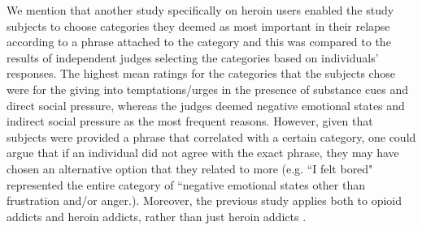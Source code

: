 \documentclass[12pt]{article}
\begin{document}
We mention that another study specifically on heroin users enabled the study subjects to choose categories they deemed as most important in their relapse according to a phrase attached to the category and this was compared to the results of independent judges selecting the categories based on individuals' responses. The highest mean ratings for the categories that the subjects chose were for the giving into temptations/urges in the presence of substance cues and direct social pressure, whereas the judges deemed negative emotional states and indirect social pressure as the most frequent reasons. However, given that subjects were provided a phrase that correlated with a certain category, one could argue that if an individual did not agree with the exact phrase, they may have chosen an alternative option that they related to more (e.g. ``I felt bored" represented the entire category of ``negative emotional states other than frustration and/or anger.). Moreover, the previous study applies both to opioid addicts and heroin addicts, rather than just heroin addicts \cite{Heather}.

\pagebreak
\end{document}
